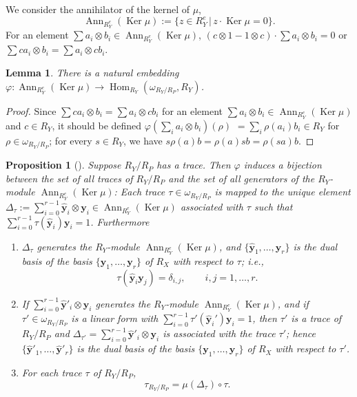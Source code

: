 \documentclass[pdftex]{sigma}
\def\bby{{\mathbf y}}
\def\hby{\widehat {{\mathbf y}}}
\def\Ker{\operatorname{Ker}}
\numberwithin{equation}{section}
\newtheorem{Lemma}[Theorem]{Lemma}
\newtheorem{Proposition}[Theorem]{Proposition}
 { \theoremstyle{definition}
\newtheorem{Definition}[Theorem]{Definition}
\newtheorem{Note}[Theorem]{Note}
\newtheorem{Example}[Theorem]{Example}
\newtheorem{Remark}[Theorem]{Remark} }
\begin{document}
We consider the annihilator of the kernel of $\mu$,
\[
\operatorname{Ann}_{R_Y^e}(\Ker \mu) :=\{ z\in R_Y^e\, |\, z\cdot \Ker \mu = 0\}.
\]
For an element $\sum a_i \otimes b_i \in\operatorname{Ann}_{R_Y^e}(\Ker \mu)$,
$(c \otimes 1-1 \otimes c)\cdot \sum a_i \otimes b_i =0$ or $\sum ca_i \otimes b_i =\sum a_i \otimes c b_i$.

\begin{Lemma}There is a natural embedding $\varphi\colon \operatorname{Ann}_{R_Y^e}(\Ker \mu)\to
\operatorname{Hom}_{R_Y}(\omega_{R_Y/R_P}, R_Y)$.
\end{Lemma}

\begin{proof}Since $\sum ca_i \otimes b_i =\sum a_i \otimes c b_i$ for an element $\sum a_i \otimes b_i \in\operatorname{Ann}_{R_Y^e}(\Ker \mu)$ and $c\in R_Y$, it should be defined
$\varphi(\sum_i a_i \otimes b_i)(\rho)$ $=\sum_i\rho(a_i) b_i\in R_Y$ for $\rho\in \omega_{R_Y/R_P}$;
for every $s\in R_Y$, we have $s \rho(a) b=\rho(a) s b=\rho(s a)b$.
\end{proof}

\begin{Proposition}[{\cite[Corollary H.20]{Kunz2004}}]\label{2pr:A_traceH20}
Suppose $R_Y/R_P$ has a trace.
Then $\varphi$ induces a bijection between the set of all traces of $R_Y/R_P$ and the set of all generators of the $R_Y$-module $\operatorname{Ann}_{R_Y^e}(\Ker \mu)$:
Each trace $\tau \in \omega_{R_Y/R_P}$ is mapped to the unique element $\Delta_\tau:=\sum_{i=0}^{r-1} \hby_i\otimes\bby_i \in \operatorname{Ann}_{R_Y^e}(\Ker \mu)$ associated with $\tau$ such that $\sum_{i=0}^{r-1}\tau( \hby_i)\bby_i =1$.
Furthermore

\begin{enumerate}\itemsep=0pt
\item[$1.$] $\Delta_\tau$ generates the $R_Y$-module $\operatorname{Ann}_{R_Y^e}(\Ker \mu)$, and $\{\hby_1, \dots, \hby_r\}$ is the dual basis of the basis $\{\bby_1, \dots, \bby_r\}$ of $R_X$ with respect to $\tau$; i.e.,
\[
\tau(\hby_i\bby_j)=\delta_{i,j}, \qquad i,j = 1, \dots, r.
\]
\item[$2.$] If $\sum_{i=0}^{r-1} \hby'_i \otimes \bby_i$ generates the $R_Y$-module $\operatorname{Ann}_{R_Y^e}(\Ker \mu)$, and if $\tau' \in \omega_{R_Y/R_P}$ is a linear form with $\sum_{i=0}^{r-1}\tau'( \hby_i')\bby_i =1$, then $\tau'$ is a trace of $R_Y/R_P$ and $\Delta_{\tau'}=\sum_{i=0}^{r-1} \hby'_i \otimes \bby_i$ is associated with the trace $\tau'$; hence $\{\hby'_1, \dots, \hby'_r\}$ is the dual basis of the basis $\{\bby_1, \dots, \bby_r\}$ of $R_X$ with respect to $\tau'$.

\item[$3.$] For each trace $\tau$ of $R_Y/R_P$,
\[
\tau_{R_Y/R_P} = \mu(\Delta_\tau)\circ \tau.
\]
\end{enumerate}
\end{Proposition}
\end{document}
